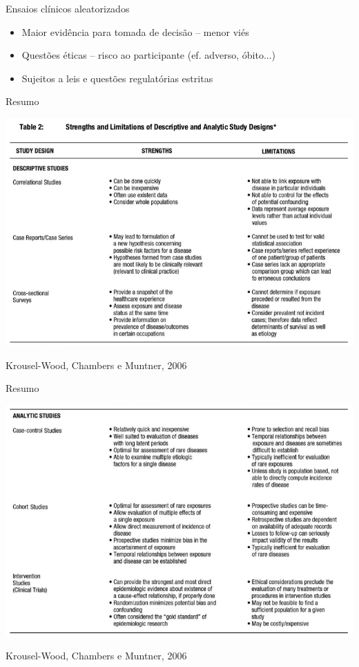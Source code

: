 \documentclass{beamer}
\begin{document}
\begin{frame}{Ensaios clínicos aleatorizados}
  \begin{itemize}
    \small
  \item Maior evidência para tomada de decisão -- menor viés
    \bigskip
  \item Questões éticas -- risco ao participante (ef. adverso, óbito...)
    \bigskip
  \item Sujeitos a leis e questões regulatórias estritas
    \bigskip
  \end{itemize}
\end{frame}

\begin{frame}{Resumo}
  \begin{center}
    \includegraphics[width=\textwidth]{Metodos/estudos-resumo1}
  \end{center}

  \vfill
  \tiny
  \hfill Krousel-Wood, Chambers e Muntner, 2006
\end{frame}

\begin{frame}{Resumo}
  \begin{center}
    \includegraphics[width=\textwidth]{Metodos/estudos-resumo2}
  \end{center}

  \vfill
  \tiny
  \hfill Krousel-Wood, Chambers e Muntner, 2006
\end{frame}
\end{document}
